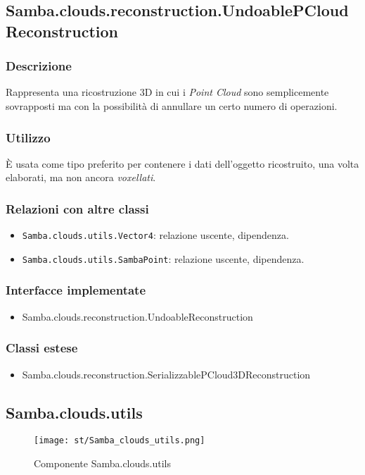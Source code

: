 \subsection{Samba.clouds.reconstruction.UndoablePCloudReconstruction}
\label{class:UndoablePCloudReconstruction}
\subsubsection{Descrizione}
Rappresenta una ricostruzione 3D in cui i \emph{Point Cloud} sono semplicemente sovrapposti ma con la possibilità di annullare un certo numero di operazioni.
\subsubsection{Utilizzo}
È usata come tipo preferito per contenere i dati dell'oggetto ricostruito, una volta elaborati, ma non ancora \emph{voxellati}.
\subsubsection{Relazioni con altre classi}
\begin{itemize}
	\item \texttt{Samba.clouds.utils.Vector4}: relazione uscente, dipendenza.
	\item \texttt{Samba.clouds.utils.SambaPoint}: relazione uscente, dipendenza.
\end{itemize}
\subsubsection{Interfacce implementate}
\begin{itemize}
	\item Samba.clouds.reconstruction.UndoableReconstruction
\end{itemize}
\subsubsection{Classi estese}
\begin{itemize}
	\item Samba.clouds.reconstruction.SerializzablePCloud3DReconstruction
\end{itemize}


\subsection{Samba.clouds.utils}
\begin{figure}[!h] 
    \centering 
    \texttt{[image: st/Samba\_clouds\_utils.png]} 
    \caption{Componente Samba.clouds.utils}
\end{figure}
